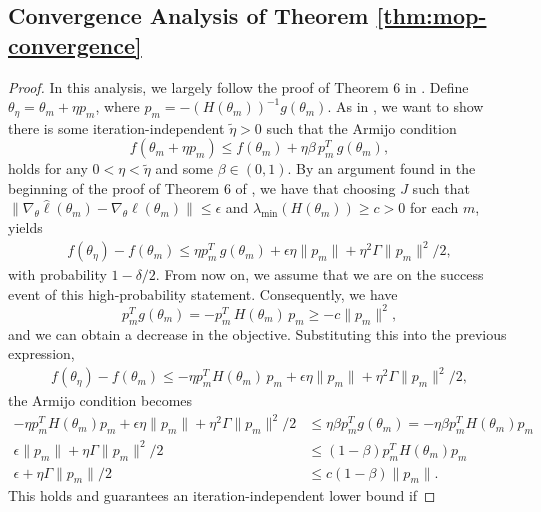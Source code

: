 \subsection{Convergence Analysis of Theorem \ref{thm:mop-convergence}}

\begin{proof}
In this analysis, we largely follow the proof of Theorem 6 in \cite{mahoney16}.
Define $\theta_\eta = \theta_m + \eta p_m$, where $p_m=-(H(\theta_m))^{-1}g(\theta_m)$. 
As in \cite{mahoney16}, we want to show there is some iteration-independent $\tilde{\eta}>0$ such that the Armijo condition
\begin{equation}
    f(\theta_m+\eta p_m) \leq f(\theta_m) + \eta\beta \, p_m^T \, g(\theta_m),
\end{equation}
holds for any $0< \eta < \tilde{\eta}$ and some $\beta \in (0,1)$.
By an argument found in the beginning of the proof of Theorem 6 of \cite{mahoney16}, we have that choosing $J$ such that $\|\nabla_\theta\hat{\ell}(\theta_m) - \nabla_\theta \ell(\theta_m)\| \leq \epsilon$ and $\lambda_{\min}(H(\theta_m)) \geq c>0$ for each $m$, yields
\begin{align}
    f(\theta_\eta)-f(\theta_m) \leq \eta p_m^T\, g(\theta_m) + \epsilon\eta\|p_m\| + \eta^2 \Gamma \|p_m\|^2 / 2,
\end{align}
with probability $1-\delta/2$. 
From now on, we assume that we are on the success event of this high-probability statement. 
Consequently, we have
\begin{equation}
    p_m^Tg(\theta_m) = -p_m^T\, H(\theta_m)\, p_m \geq -c\|p_m\|^2,
\end{equation}
and we can obtain a decrease in the objective. 
Substituting this into the previous expression,
\begin{align}
    f(\theta_\eta)-f(\theta_m) \leq -\eta p_m^TH(\theta_m)\, p_m + \epsilon\eta\|p_m\| + \eta^2 \Gamma \|p_m\|^2 / 2,
\end{align}
the Armijo condition becomes
\begin{align}
    -\eta p_m^TH(\theta_m)p_m + \epsilon\eta\|p_m\| + \eta^2 \Gamma \|p_m\|^2 / 2 &\leq \eta \beta p_m^Tg(\theta_m) = - \eta \beta p_m^TH(\theta_m)p_m \\
    \epsilon\|p_m\| + \eta \Gamma \|p_m\|^2 / 2 &\leq (1- \beta) p_m^TH(\theta_m)p_m \\
    \epsilon + \eta \Gamma \|p_m\| / 2 &\leq c(1- \beta) \|p_m\|.
\end{align}
This holds and guarantees an iteration-independent lower bound if 

\end{proof}
